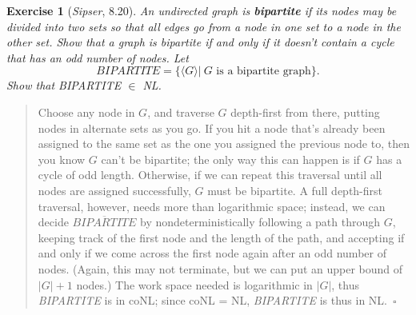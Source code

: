 \documentclass{article}
\theoremstyle{break}			%
\newtheorem{exercise}{Exercise}
\theoremstyle{plain}
\newenvironment{answer}{\begin{quotation}\noindent}{\end{quotation}}
\newcommand{\sipser}{\textit{Sipser}}
\newcommand{\encoding}[1]{\ensuremath{\langle#1\rangle}}
\renewcommand{\qed}{~\ensuremath{\square}}
\newcommand{\defin}[1]{\textbf{\textit{#1}}}
\newcommand{\setname}[1]{\textit{#1}}
\begin{document}
\begin{exercise}[\sipser, 8.20]
An undirected graph is \defin{bipartite} if its nodes may be divided
into two sets so that all edges go from a node in one set to a node in
the other set.  Show that a graph is bipartite if and only if it
doesn't contain a cycle that has an odd number of nodes.  Let
\begin{displaymath}
\setname{BIPARTITE}=\{\encoding{G}|~G\text{ is a bipartite graph}\}.
\end{displaymath}
Show that \setname{BIPARTITE} $\in$ NL.
\end{exercise}
\begin{answer}
Choose any node in $G$, and traverse $G$ depth-first from there,
putting nodes in alternate sets as you go.  If you hit a node that's
already been assigned to the same set as the one you assigned the
previous node to, then you know $G$ can't be bipartite; the only way
this can happen is if $G$ has a cycle of odd length.  Otherwise, if we
can repeat this traversal until all nodes are assigned successfully,
$G$ must be bipartite.  A full depth-first traversal, however, needs
more than logarithmic space; instead, we can decide
$\overline{\setname{BIPARTITE}}$ by nondeterministically following a
path through $G$, keeping track of the first node and the length of
the path, and accepting if and only if we come across the first node
again after an odd number of nodes.  (Again, this may not terminate,
but we can put an upper bound of $|G|+1$ nodes.)  The work space
needed is logarithmic in $|G|$, thus \setname{BIPARTITE} is in coNL;
since coNL = NL, \setname{BIPARTITE} is thus in NL.\qed
\end{answer}
\end{document}
